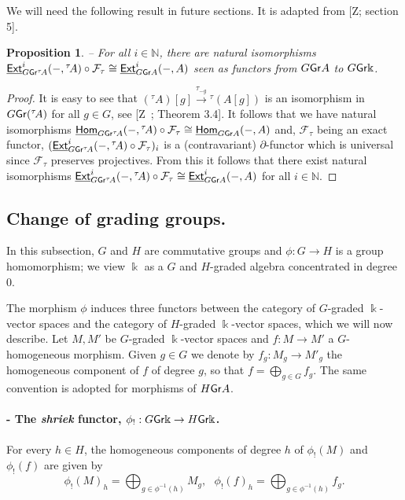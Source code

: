 \documentclass[twoside,11pt]{article}
\renewcommand{\k}{\Bbbk}
\newcommand{\N}{{\mathbb N}}
\newcommand{\F}{{\mathcal F}}
\newcommand{\GrMod}{{\sf Gr}}
\newcommand{\HOM}{\underline{{\sf Hom}}}
\newcommand{\EXT}{\underline{\sf Ext}}
\newtheorem{subproposition}[subtheorem]{Proposition}
\begin{document}
We will need the following result in future sections. It is adapted from [Z; section 5].
\begin{subproposition} -- \label{twisting-ext}
For all $i\in\N$, there are natural isomorphisms $\EXT^i_{G\GrMod {}^\tau\!
A}(-,{}^\tau\! A) \circ \F_\tau \cong \EXT^i_{G\GrMod A}(-,A)$ seen as functors from
$G\GrMod A$ to $G\GrMod \k$.
\end{subproposition}

\begin{proof} It is easy to see that $({}^\tau\! A)[g] \stackrel{\tau_{-g}}{\longrightarrow}
{}^\tau\! (A[g])$ is an  isomorphism in $G\GrMod({}^\tau\! A)$ for all $g \in G$, see [Z~;
Theorem 3.4]. It follows that we have natural isomorphisms $\HOM_{G\GrMod {}^\tau\!
A}(-,{}^\tau\! A) \circ \F_\tau \cong \HOM_{G\GrMod A}(-,A)$ and, $\F_\tau$ being an
exact functor, $(\EXT^i_{G\GrMod {}^\tau\! A}(-,{}^\tau\! A) \circ \F_\tau)_i$ is a
(contravariant) $\partial$-functor which is universal since $\F_\tau$ preserves
projectives. From this it follows that there exist natural
isomorphisms $\EXT^i_{G\GrMod {}^\tau\! A}(-,{}^\tau\! A) \circ \F_\tau \cong
\EXT^i_{G\GrMod A}(-,A)$  for all $i\in\N$. \end{proof}

\subsection{Change of grading groups.} \label{ss-change-grading-group}

In this subsection, $G$ and $H$ are commutative groups and $\phi: G \longrightarrow H$ is
a group homomorphism; we view $\k$ as a $G$ and $H$-graded algebra concentrated in degree
$0$. 

The morphism $\phi$ induces three functors between the category of $G$-graded $\k$-vector
spaces and the category of $H$-graded $\k$-vector spaces, which we will now describe.
Let $M, M'$ be $G$-graded $\k$-vector spaces and $f: M \longrightarrow M'$ a
$G$-homogeneous morphism. Given $g \in G$ we denote by $f_g :M_g \longrightarrow M'_g$ 
the homogeneous component of $f$ of degree $g$, so that $f = \bigoplus_{g \in G}f_g$. The
same convention is adopted for morphisms of $H\GrMod A $.

\paragraph{- The \emph{shriek} functor, $\phi_! : G \GrMod \k \to H \GrMod \k$.} For every
$h \in H$, the homogeneous components of degree $h$ of $\phi_!(M)$ and $\phi_!(f)$ are
given by
\[
	\phi_!(M)_h = \bigoplus_{g \in \phi^{-1}(h)}M_g, \ \ \ \phi_!(f)_h = \bigoplus_{g
	\in \phi^{-1}(h)} f_g.
\]
\end{document}
